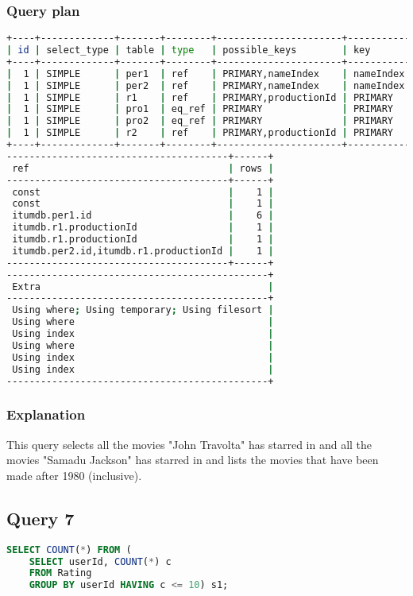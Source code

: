 \subsubsection{Query plan}
\begin{lstlisting}[language=bash]
+----+-------------+-------+--------+----------------------+-----------+---------+
| id | select_type | table | type   | possible_keys        | key       | key_len |
+----+-------------+-------+--------+----------------------+-----------+---------+
|  1 | SIMPLE      | per1  | ref    | PRIMARY,nameIndex    | nameIndex | 32      |
|  1 | SIMPLE      | per2  | ref    | PRIMARY,nameIndex    | nameIndex | 32      |
|  1 | SIMPLE      | r1    | ref    | PRIMARY,productionId | PRIMARY   | 4       |
|  1 | SIMPLE      | pro1  | eq_ref | PRIMARY              | PRIMARY   | 4       |
|  1 | SIMPLE      | pro2  | eq_ref | PRIMARY              | PRIMARY   | 4       |
|  1 | SIMPLE      | r2    | ref    | PRIMARY,productionId | PRIMARY   | 8       |
+----+-------------+-------+--------+----------------------+-----------+---------+
---------------------------------------+------+
 ref                                   | rows |
---------------------------------------+------+
 const                                 |    1 |
 const                                 |    1 |
 itumdb.per1.id                        |    6 |
 itumdb.r1.productionId                |    1 |
 itumdb.r1.productionId                |    1 |
 itumdb.per2.id,itumdb.r1.productionId |    1 |
---------------------------------------+------+
----------------------------------------------+
 Extra                                        |
----------------------------------------------+
 Using where; Using temporary; Using filesort |
 Using where                                  |
 Using index                                  |
 Using where                                  |
 Using index                                  |
 Using index                                  |
----------------------------------------------+
\end{lstlisting}

\subsubsection{Explanation}
This query selects all the movies "John Travolta" has starred in and all the movies "Samadu Jackson" has starred in and lists the movies that have been made after 1980 (inclusive).


\bigskip
\subsection{Query 7}
\begin{lstlisting}[language=sql]
SELECT COUNT(*) FROM (
	SELECT userId, COUNT(*) c
	FROM Rating
	GROUP BY userId HAVING c <= 10) s1;
\end{lstlisting}

